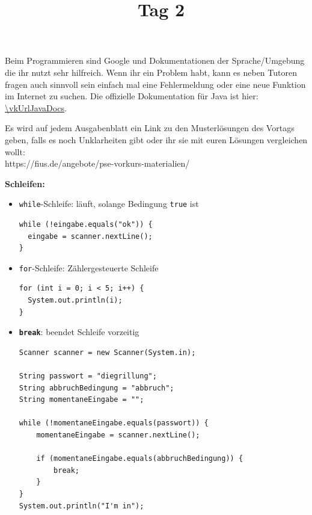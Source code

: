 \documentclass{../../sheet}
\title{\vkTitle\ Tag 2}
\begin{document}
\maketitle

Beim Programmieren sind Google und Dokumentationen der Sprache/Umgebung die ihr nutzt sehr hilfreich. Wenn ihr ein Problem habt, kann es neben Tutoren fragen auch sinnvoll sein einfach mal eine Fehlermeldung oder eine neue Funktion im Internet zu suchen. Die offizielle Dokumentation für Java ist hier: \url{\vkUrlJavaDocs}.

Es wird auf jedem Ausgabenblatt ein Link zu den Musterlösungen des Vortags geben, falls es noch Unklarheiten gibt oder ihr sie mit euren Lösungen vergleichen wollt: \\ https://fius.de/angebote/pse-vorkurs-materialien/

\newpage
{}

\bigskip
\textbf{Schleifen:}
\begin{itemize}
    \item \texttt{while}-Schleife: läuft, solange Bedingung \texttt{true} ist
          \begin{verbatim}
while (!eingabe.equals("ok")) {
  eingabe = scanner.nextLine();
}
          \end{verbatim}
    \item \texttt{for}-Schleife: Zählergesteuerte Schleife
          \begin{verbatim}
for (int i = 0; i < 5; i++) {
  System.out.println(i);
}
          \end{verbatim}
    \item \textbf{\texttt{break}}: beendet Schleife vorzeitig
    \begin{verbatim}
Scanner scanner = new Scanner(System.in);

String passwort = "diegrillung";
String abbruchBedingung = "abbruch";
String momentaneEingabe = "";

while (!momentaneEingabe.equals(passwort)) {
    momentaneEingabe = scanner.nextLine();

    if (momentaneEingabe.equals(abbruchBedingung)) {
        break;
    }
}
System.out.println("I'm in");
\end{verbatim}

\end{itemize}
\end{document}
